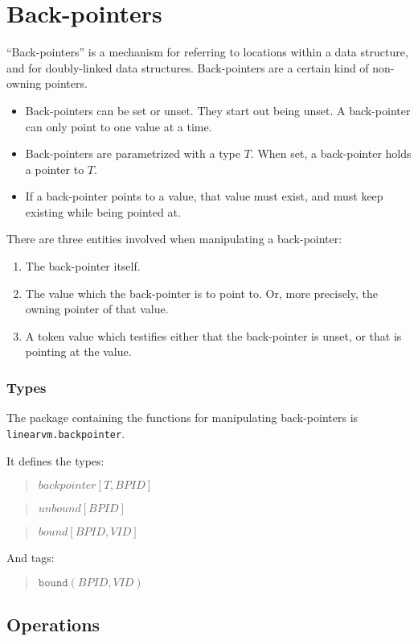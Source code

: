 \documentclass[a4paper]{book}
\newcommand\TypeDefinition[1]{\begin{quote}$\mathit{#1}$\end{quote}}
\newcommand\TagDefinitionII[2]{\begin{quote}$\mathtt{#1}(#2)$\end{quote}}
\begin{document}

\chapter{Back-pointers}
``Back-pointers'' is a mechanism for referring to locations within
a data structure, and for doubly-linked data structures.
Back-pointers are a certain kind of non-owning pointers.

\begin{itemize}
\item Back-pointers can be set or unset. They start out being unset.
  A back-pointer can only point to one value at a time.
\item Back-pointers are parametrized with a type $T$.
  When set, a back-pointer holds a pointer to $T$.
\item If a back-pointer points to a value, that value must exist,
  and must keep existing while being pointed at.
\end{itemize}

There are three entities involved when manipulating a back-pointer:
\begin{enumerate}
\item The back-pointer itself.
\item The value which the back-pointer is to point to.
  Or, more precisely, the owning pointer of that value.
\item A token value which testifies either that the back-pointer is unset,
  or that is pointing at the value.
\end{enumerate}

\subsection*{Types}
The package containing the functions for manipulating back-pointers is
\texttt{linearvm.backpointer}.

It defines the types:

\TypeDefinition{backpointer[T,BPID]}
\TypeDefinition{unbound[BPID]}
\TypeDefinition{bound[BPID,VID]}

And tags:
\TagDefinitionII{bound}{BPID,VID}


\section*{Operations}
\end{document}
